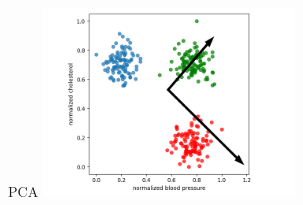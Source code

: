 \documentclass{irdbeamer}
\begin{document}




\begin{frame}{PCA}
    \centering
        \includegraphics[width=0.5\textwidth]{./figs/pca3.png}%
\end{frame}
\end{document}
